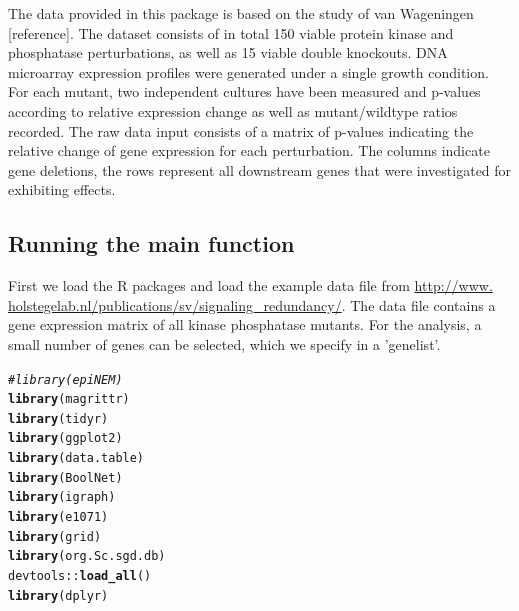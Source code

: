 \documentclass[paper=a4,notitlepage,DIV=12]{scrartcl}\usepackage[]{graphicx}\usepackage[]{color}
\makeatletter
\newcommand{\hlcom}[1]{\textcolor[rgb]{0.678,0.584,0.686}{\textit{#1}}}%
\newcommand{\hlopt}[1]{\textcolor[rgb]{0,0,0}{#1}}%
\newcommand{\hlstd}[1]{\textcolor[rgb]{0.345,0.345,0.345}{#1}}%
\newcommand{\hlkwd}[1]{\textcolor[rgb]{0.737,0.353,0.396}{\textbf{#1}}}%
\newenvironment{kframe}{%
 \def\at@end@of@kframe{}%
 \ifinner\ifhmode%
  \def\at@end@of@kframe{\end{minipage}}%
  \begin{minipage}{\columnwidth}%
 \fi\fi%
 \def\FrameCommand##1{\hskip\@totalleftmargin \hskip-\fboxsep
 \colorbox{shadecolor}{##1}\hskip-\fboxsep
     \hskip-\linewidth \hskip-\@totalleftmargin \hskip\columnwidth}%
 \MakeFramed {\advance\hsize-\width
   \@totalleftmargin\z@ \linewidth\hsize
   \@setminipage}}%
 {\par\unskip\endMakeFramed%
 \at@end@of@kframe}
\newenvironment{knitrout}{}{} %
\makeatother
\begin{document}
The data provided in this package is based on the study of van Wageningen [reference]. The dataset consists of in total 150 viable protein kinase and phosphatase perturbations, as well as 15 viable double knockouts. DNA microarray expression profiles were generated under a single growth condition. For each mutant, two independent cultures have been measured and p-values according to relative expression change as well as mutant/wildtype ratios recorded.
The raw data input consists of a matrix of p-values indicating the relative change of gene expression for each perturbation. The columns indicate gene deletions, the rows represent all downstream genes that were investigated for exhibiting effects.

\subsection{Running the main function}

First we load the R packages and load the example data file from \url{http://www.
holstegelab.nl/publications/sv/signaling_redundancy/}. The data file contains a gene expression matrix of all kinase phosphatase mutants. For the analysis, a small number of genes can be selected, which we specify in a 'genelist'.

\begin{knitrout}
\color{fgcolor}\begin{kframe}
\begin{alltt}
\hlcom{#library(epiNEM)}
\hlkwd{library}\hlstd{(magrittr)}
\hlkwd{library}\hlstd{(tidyr)}
\hlkwd{library}\hlstd{(ggplot2)}
\hlkwd{library}\hlstd{(data.table)}
\hlkwd{library}\hlstd{(BoolNet)}
\hlkwd{library}\hlstd{(igraph)}
\hlkwd{library}\hlstd{(e1071)}
\hlkwd{library}\hlstd{(grid)}
\hlkwd{library}\hlstd{(org.Sc.sgd.db)}
\hlstd{devtools}\hlopt{::}\hlkwd{load_all}\hlstd{()}
\hlkwd{library}\hlstd{(dplyr)}
\end{alltt}
\end{kframe}
\end{knitrout}
\end{document}
